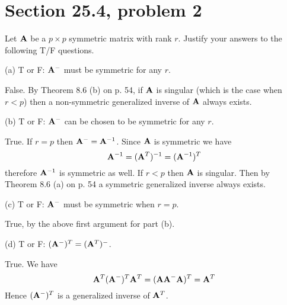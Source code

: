 \section{Section 25.4, problem 2}
Let $\bf A$ be a $p\times p$ symmetric matrix with rank $r$.
Justify your answers to the following T/F questions.

\bigskip
\noindent
(a) T or F: ${\bf A}^{-{}}$ must be symmetric for any $r$.

\bigskip
\noindent
False. By Theorem 8.6 (b) on p. 54,
if $\bf A$ is singular (which is the case
when $r<p$) then a non-symmetric generalized inverse of $\bf A$
always exists.

\bigskip
\noindent
(b) T or F: ${\bf A}^{-{}}$ can be chosen to be symmetric for
any $r$.

\bigskip
\noindent
True. If $r=p$ then ${\bf A}^{-{}}={\bf A}^{-1}$.
Since $\bf A$ is symmetric we have
$${\bf A}^{-1}=({\bf A}^T)^{-1}=({\bf A}^{-1})^T$$
therefore ${\bf A}^{-1}$ is symmetric as well.
If $r<p$ then $\bf A$ is singular.
Then by Theorem 8.6 (a) on p. 54
a symmetric generalized inverse always exists.

\bigskip
\noindent
(c) T or F: ${\bf A}^{-{}}$ must be symmetric when $r=p$.

\bigskip
\noindent
True, by the above first argument for part (b).

\bigskip
\noindent
(d) T or F: $({\bf A}^{-{}})^T=({\bf A}^T)^{-{}}$.

\bigskip
\noindent
True. We have
$${\bf A}^T({\bf A}^{-{}})^T{\bf A}^T
=({\bf AA}^{-{}}{\bf A})^T={\bf A}^T$$
Hence $({\bf A}^{-{}})^T$ is a generalized inverse of ${\bf A}^T$.
